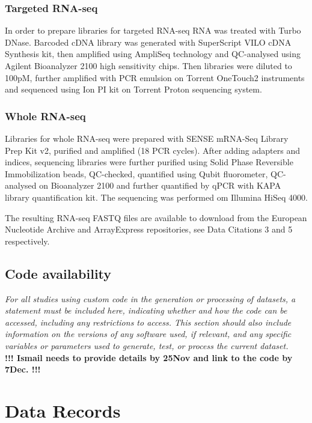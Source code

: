 \documentclass[english]{article}
\begin{document}
\subsubsection*{Targeted RNA-seq}
In order to prepare libraries for targeted RNA-seq RNA was treated with Turbo DNase. Barcoded cDNA library was generated with SuperScript VILO cDNA Synthesis kit, then amplified using AmpliSeq technology and QC-analysed using Agilent Bioanalyzer 2100 high sensitivity chips. Then libraries were diluted to 100pM, further amplified with PCR emulsion on Torrent OneTouch2 instruments and sequenced using Ion PI kit on Torrent Proton sequencing system.
\subsubsection*{Whole RNA-seq}
Libraries for whole RNA-seq were prepared with SENSE mRNA-Seq Library Prep Kit v2, purified and amplified (18 PCR cycles). After adding adapters and indices, sequencing libraries were further purified using Solid Phase Reversible Immobilization beads, QC-checked, quantified using Qubit fluorometer, QC-analysed on Bioanalyzer 2100 and further quantified by qPCR with KAPA library quantification kit. The sequencing was performed om Illumina HiSeq 4000.

The resulting RNA-seq FASTQ files are available to download from the European Nucleotide Archive and ArrayExpress repositories, see Data Citations 3 and 5 respectively.

\subsection*{Code availability}

\textit{For all studies using custom code in the generation or processing of datasets, 
a statement must be included here, indicating whether and how the code can be 
accessed, including any restrictions to access. This section should also include 
information on the versions of any software used, if relevant, and any specific 
variables or parameters used to generate, test, or process the current dataset.}
\\
\colorbox{BurntOrange}{\textbf{!!! Ismail needs to provide details by 25Nov and link to the code by 7Dec. !!!}}


\section*{Data Records}
\end{document}
